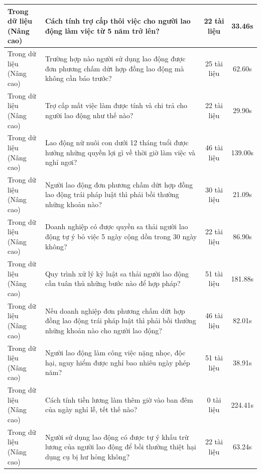\begin{longtable}{|l|p{6.5cm}|c|c|}
\makecell[l]{Trong dữ liệu\\(Nâng cao)} & Cách tính trợ cấp thôi việc cho người lao động làm việc từ 5 năm trở lên? & 22 tài liệu & 33.46s \\ \hline
\makecell[l]{Trong dữ liệu\\(Nâng cao)} & Trường hợp nào người sử dụng lao động được đơn phương chấm dứt hợp đồng lao động mà không cần báo trước? & 25 tài liệu & 62.60s \\ \hline
\makecell[l]{Trong dữ liệu\\(Nâng cao)} & Trợ cấp mất việc làm được tính và chi trả cho người lao động như thế nào? & 22 tài liệu & 29.90s \\ \hline
\makecell[l]{Trong dữ liệu\\(Nâng cao)} & Lao động nữ nuôi con dưới 12 tháng tuổi được hưởng những quyền lợi gì về thời giờ làm việc và nghỉ ngơi? & 46 tài liệu & 139.00s \\ \hline
\makecell[l]{Trong dữ liệu\\(Nâng cao)} & Người lao động đơn phương chấm dứt hợp đồng lao động trái pháp luật thì phải bồi thường những khoản nào? & 30 tài liệu & 21.09s \\ \hline
\makecell[l]{Trong dữ liệu\\(Nâng cao)} & Doanh nghiệp có được quyền sa thải người lao động tự ý bỏ việc 5 ngày cộng dồn trong 30 ngày không? & 22 tài liệu & 86.90s \\ \hline
\makecell[l]{Trong dữ liệu\\(Nâng cao)} & Quy trình xử lý kỷ luật sa thải người lao động cần tuân thủ những bước nào để hợp pháp? & 51 tài liệu & 181.88s \\ \hline
\makecell[l]{Trong dữ liệu\\(Nâng cao)} & Nếu doanh nghiệp đơn phương chấm dứt hợp đồng lao động trái pháp luật thì phải bồi thường những khoản nào cho người lao động? & 46 tài liệu & 82.01s \\ \hline
\makecell[l]{Trong dữ liệu\\(Nâng cao)} & Người lao động làm công việc nặng nhọc, độc hại, nguy hiểm được nghỉ bao nhiêu ngày phép năm? & 51 tài liệu & 38.91s \\ \hline
\makecell[l]{Trong dữ liệu\\(Nâng cao)} & Cách tính tiền lương làm thêm giờ vào ban đêm của ngày nghỉ lễ, tết thế nào? & 0 tài liệu & 224.41s \\ \hline
\makecell[l]{Trong dữ liệu\\(Nâng cao)} & Người sử dụng lao động có được tự ý khấu trừ lương của người lao động để bồi thường thiệt hại dụng cụ bị hư hỏng không? & 22 tài liệu & 63.24s \\ \hline

\end{longtable}
